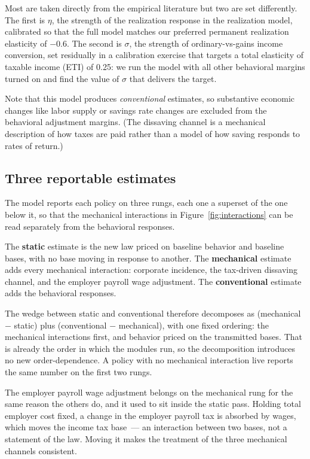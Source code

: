 \documentclass[10pt,twocolumn]{article}
\begin{document}
Most are taken directly from the
empirical literature but two are set differently. The first is $\eta$, the strength of the realization response in the realization model, calibrated so that the full model matches our preferred permanent realization elasticity of $-0.6$. The second is $\sigma$, the strength of ordinary-vs-gains income
conversion, set residually in a calibration exercise that targets a total elasticity of taxable income (ETI) of 0.25: we run the model with all other behavioral margins turned on and find
the value of $\sigma$ that delivers the target.

Note that this model produces \emph{conventional} estimates, so substantive
economic changes like labor supply or savings rate changes are excluded from
the behavioral adjustment margins. (The dissaving channel is a mechanical
description of how taxes are paid rather than a model of how saving responds to rates
of return.)

\subsection*{Three reportable estimates}

The model reports each policy on three rungs, each one a superset of the one
below it, so that the mechanical interactions in Figure~\ref{fig:interactions}
can be read separately from the behavioral responses.

The \textbf{static} estimate is the new law priced on baseline behavior and
baseline bases, with no base moving in response to another. The
\textbf{mechanical} estimate adds every mechanical interaction: corporate
incidence, the tax-driven dissaving channel, and the employer payroll wage
adjustment. The \textbf{conventional} estimate adds the behavioral responses.

The wedge between static and conventional therefore decomposes as
(mechanical $-$ static) plus (conventional $-$ mechanical), with one fixed
ordering: the mechanical interactions first, and behavior priced on the
transmitted bases. That is already the order in which the modules run, so the
decomposition introduces no new order-dependence. A policy with no mechanical
interaction live reports the same number on the first two rungs.

The employer payroll wage adjustment belongs on the mechanical rung for the same
reason the others do, and it used to sit inside the static pass. Holding total
employer cost fixed, a change in the employer payroll tax is absorbed by wages,
which moves the income tax base~--- an interaction between two bases, not a
statement of the law. Moving it makes the treatment of the three mechanical
channels consistent.
\end{document}
